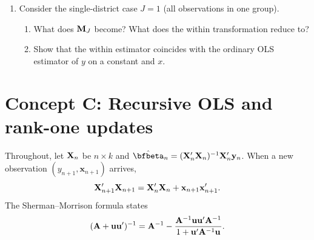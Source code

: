 \documentclass{article}
\begin{document}
\begin{enumerate}[label=\textbf{B.\arabic*},leftmargin=*,itemsep=10pt]
\item  Consider the single-district case $J = 1$ (all observations in one group).
\begin{enumerate}[label=(\alph*)]
  \item What does ${\mathbf M}_J$ become?  What does the within transformation reduce to?
  \item Show that the within estimator coincides with the ordinary OLS estimator of $y$ on a constant and $x$.
\end{enumerate}

\end{enumerate}

\bigskip

\section*{Concept C: Recursive OLS and rank-one updates}

Throughout, let ${\mathbf X}_n$ be $n\times k$ and $\hat\bfbeta_n = (\bfX_n'\bfX_n)^{-1}\bfX_n'\bfy_n$.  When a new observation $(y_{n+1}, \bm x_{n+1})$ arrives,
$${\mathbf X}_{n+1}'{\mathbf X}_{n+1} = {\mathbf X}_n'{\mathbf X}_n + \mathbf x_{n+1}\mathbf x_{n+1}'.$$
The Sherman--Morrison formula states
$$({\mathbf A} + \mathbf u\mathbf u')^{-1} = {\mathbf A}^{-1} - \frac{{\mathbf A}^{-1}\mathbf u\mathbf u'{\mathbf A}^{-1}}{1 + \mathbf u'{\mathbf A}^{-1}\mathbf u}.$$
\end{document}
